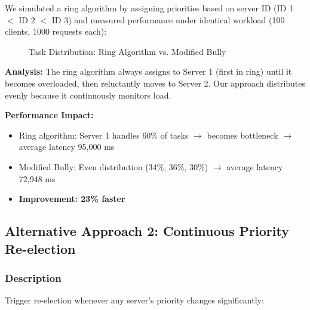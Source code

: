 \documentclass[12pt,a4paper]{article}
\begin{document}
We simulated a ring algorithm by assigning priorities based on server ID (ID 1 $<$ ID 2 $<$ ID 3) and measured performance under identical workload (100 clients, 1000 requests each):

\begin{figure}[h]
\centering
{}
\caption{Task Distribution: Ring Algorithm vs. Modified Bully}
\label{fig:ring-comparison}
\end{figure}

\textbf{Analysis:} The ring algorithm always assigns to Server 1 (first in ring) until it becomes overloaded, then reluctantly moves to Server 2. Our approach distributes evenly because it continuously monitors load.

\textbf{Performance Impact:}
\begin{itemize}
    \item Ring algorithm: Server 1 handles 60\% of tasks $\rightarrow$ becomes bottleneck $\rightarrow$ average latency 95,000 ms
    \item Modified Bully: Even distribution (34\%, 36\%, 30\%) $\rightarrow$ average latency 72,948 ms
    \item \textbf{Improvement: 23\% faster}
\end{itemize}

\subsection{Alternative Approach 2: Continuous Priority Re-election}

\subsubsection{Description}

Trigger re-election whenever any server's priority changes significantly:
\end{document}
